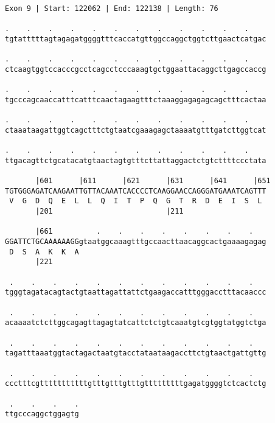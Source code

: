 \documentclass{article}
\begin{document}
\begin{Verbatim}
Exon 9 | Start: 122062 | End: 122138 | Length: 76
 
.    .    .    .    .    .    .    .    .    .    .    .    
tgtatttttagtagagatggggtttcaccatgttggccaggctggtcttgaactcatgac
  
.    .    .    .    .    .    .    .    .    .    .    .    
ctcaagtggtccacccgcctcagcctcccaaagtgctggaattacaggcttgagccaccg
  
.    .    .    .    .    .    .    .    .    .    .    .    
tgcccagcaaccatttcatttcaactagaagtttctaaaggagagagcagctttcactaa
  
.    .    .    .    .    .    .    .    .    .    .    .    
ctaaataagattggtcagctttctgtaatcgaaagagctaaaatgtttgatcttggtcat
  
.    .    .    .    .    .    .    .    .    .    .    .    
ttgacagttctgcatacatgtaactagtgtttcttattaggactctgtcttttccctata
  
       |601      |611      |621      |631      |641      |651
TGTGGGAGATCAAGAATTGTTACAAATCACCCCTCAAGGAACCAGGGATGAAATCAGTTT
 V  G  D  Q  E  L  L  Q  I  T  P  Q  G  T  R  D  E  I  S  L 
       |201                          |211                   
  
       |661          .    .    .    .    .    .    .    .   
GGATTCTGCAAAAAAGGgtaatggcaaagtttgccaacttaacaggcactgaaaagagag
 D  S  A  K  K  A                                           
       |221                                                 
  
 .    .    .    .    .    .    .    .    .    .    .    .   
tgggtagatacagtactgtaattagattattctgaagaccatttgggacctttacaaccc
  
 .    .    .    .    .    .    .    .    .    .    .    .   
acaaaatctcttggcagagttagagtatcattctctgtcaaatgtcgtggtatggtctga
  
 .    .    .    .    .    .    .    .    .    .    .    .   
tagatttaaatggtactagactaatgtacctataataagaccttctgtaactgattgttg
  
 .    .    .    .    .    .    .    .    .    .    .    .   
ccctttcgtttttttttttgtttgtttgtttgtttttttttgagatggggtctcactctg
  
 .    .    .    .
ttgcccaggctggagtg
\end{Verbatim}
\newpage
\end{document}
